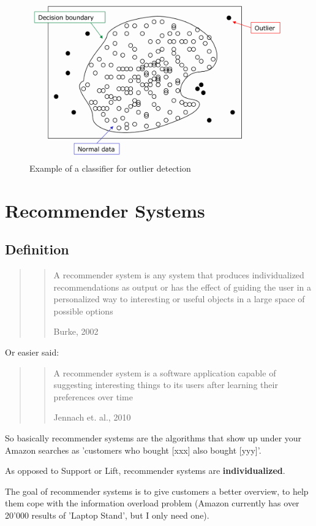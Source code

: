 \documentclass[11pt]{article}
\begin{document}
\begin{figure}[tbh!]
    \centering
    \includegraphics[width=0.7\linewidth, keepaspectratio]{Pictures/outlier_clustering_method_classification}
    \caption{Example of a classifier for outlier detection}
    \label{fig:outlierclusteringmethodclassification}
\end{figure}

\section{Recommender Systems}

\subsection{Definition}

\begin{quote}
    \blockquote[Burke, 2002]{A recommender system is any system that produces individualized recommendations as output or has the effect of guiding the user in a personalized way to interesting or useful objects in a large space of possible options}
\end{quote}

Or easier said:

\begin{quote}
    \blockquote[Jennach et. al., 2010]{A recommender system is a software application capable of suggesting interesting things to its users after learning their preferences over time}
\end{quote}

So basically recommender systems are the algorithms that show up under your Amazon searches as 'customers who bought [xxx] also bought [yyy]'.

As opposed to Support or Lift, recommender systems are \textbf{individualized}.

\vspace{10px}

The goal of recommender systems is to give customers a better overview, to help them cope with the information overload problem (Amazon currently has over 20'000 results of 'Laptop Stand', but I only need one).
\end{document}
